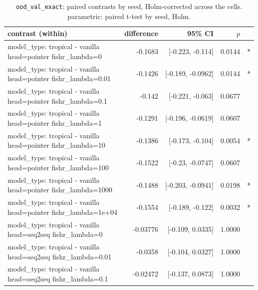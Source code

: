 \documentclass[10pt]{article}
\makeatletter
\newcommand{\stackcell}[1]{\begin{tabular}[t]{@{}l@{}}#1\end{tabular}}
\makeatother
\begin{document}
{\small
\begin{longtable}{lrrrl}
\caption{\texttt{ood\_val\_exact}: paired contrasts by seed, Holm-corrected across the cells. parametric: paired t-test by seed, Holm.}\label{tab:paired-ood_val_exact}\\
\toprule
contrast (within) & difference & 95\% CI & $p$ & \\
\midrule
\endhead
\stackcell{model\_type: tropical - vanilla\\\footnotesize head=pointer fishr\_lambda=0 } & -0.1683 & [-0.223, -0.114] & 0.0144 & *\\
\stackcell{model\_type: tropical - vanilla\\\footnotesize head=pointer fishr\_lambda=0.01 } & -0.1426 & [-0.189, -0.0962] & 0.0144 & *\\
\stackcell{model\_type: tropical - vanilla\\\footnotesize head=pointer fishr\_lambda=0.1 } & -0.142 & [-0.221, -0.063] & 0.0677 & \\
\stackcell{model\_type: tropical - vanilla\\\footnotesize head=pointer fishr\_lambda=1 } & -0.1291 & [-0.196, -0.0619] & 0.0607 & \\
\stackcell{model\_type: tropical - vanilla\\\footnotesize head=pointer fishr\_lambda=10 } & -0.1386 & [-0.173, -0.104] & 0.0054 & *\\
\stackcell{model\_type: tropical - vanilla\\\footnotesize head=pointer fishr\_lambda=100 } & -0.1522 & [-0.23, -0.0747] & 0.0607 & \\
\stackcell{model\_type: tropical - vanilla\\\footnotesize head=pointer fishr\_lambda=1000 } & -0.1488 & [-0.203, -0.0941] & 0.0198 & *\\
\stackcell{model\_type: tropical - vanilla\\\footnotesize head=pointer fishr\_lambda=1e+04 } & -0.1554 & [-0.189, -0.122] & 0.0032 & *\\
\stackcell{model\_type: tropical - vanilla\\\footnotesize head=seq2seq fishr\_lambda=0 } & -0.03776 & [-0.109, 0.0335] & 1.0000 & \\
\stackcell{model\_type: tropical - vanilla\\\footnotesize head=seq2seq fishr\_lambda=0.01 } & -0.0358 & [-0.104, 0.0327] & 1.0000 & \\
\stackcell{model\_type: tropical - vanilla\\\footnotesize head=seq2seq fishr\_lambda=0.1 } & -0.02472 & [-0.137, 0.0873] & 1.0000 & \\

\end{longtable}}
\end{document}
